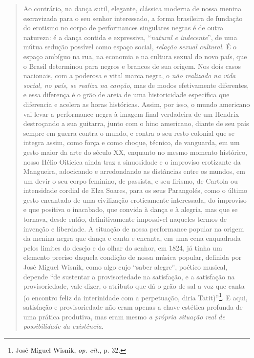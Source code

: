 \begin{quote}
Ao contrário, na dança sutil, elegante, clássica moderna de nossa menina
escravizada para o seu senhor interessado, a forma brasileira de
fundação do erotismo no corpo de performances singulares negras é de
outra natureza: é a dança contida e expressiva, ``\emph{natural e
indecente}'', de uma mútua sedução possível como espaço social,
\emph{relação sexual cultural}. É o espaço ambíguo na rua, na economia e
na cultura sexual do novo país, que o Brasil determinou para negros e
brancos de sua origem. Nos dois casos nacionais, com a poderosa e vital
marca negra, o \emph{não realizado na vida social, no país, se realiza
na canção}, mas de modos efetivamente diferentes, e essa diferença é o
grão de areia de uma historicidade específica que diferencia e acelera
as horas históricas. Assim, por isso, o mundo americano vai levar a
performance negra à imagem final verdadeira de um Hendrix destroçando a
sua guitarra, junto com o hino americano, diante de seu país sempre em
guerra contra o mundo, e contra o seu resto colonial que se integra
assim, como força e como choque, técnico, de vanguarda, em um gesto
maior da arte do século XX, enquanto no mesmo momento histórico, nosso
Hélio Oiticica ainda traz a sinuosidade e o improviso erotizante da
Mangueira, adocicando e arredondando as distâncias entre os mundos, em
um devir o seu corpo feminino, de passista, e seu lirismo, de Cartola ou
intensidade cordial de Elza Soares, para os seus Parangolés, como o
último gesto encantado de uma civilização eroticamente interessada, do
improviso e que positiva o inacabado, que convida à dança e à alegria,
mas que se tornava, desde então, definitivamente impossível naqueles
termos de invenção e liberdade. A situação de nossa performance popular
na origem da menina negra que dança e canta e encanta, em uma cena
enquadrada pelos limites do desejo e do olhar do senhor, em 1824, já
tinha um elemento preciso daquela condição de nossa música popular,
definida por José Miguel Wisnik, como algo cujo ``saber alegre'',
poético musical, depende ``de sustentar a provisoriedade na satisfação,
e a satisfação na provisoriedade, vale dizer, o atributo que dá o grão
de sal a voz que canta (o encontro feliz da interinidade com a
perpetuação, diria Tatit)''\footnote{José Miguel Wisnik, \emph{op.
  cit.}, p. 32.}. E aqui, satisfação e provisoriedade não eram apenas a
chave estética profunda de uma prática produtiva, mas eram mesmo \emph{a
própria situação real de possibilidade da existência}.


\end{quote}
